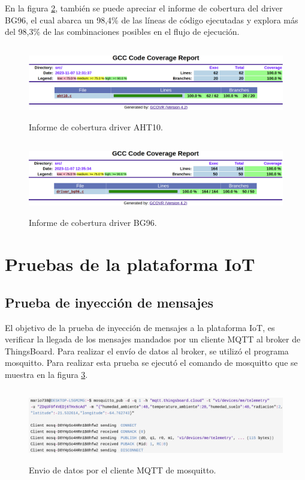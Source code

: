 En la figura \ref{fig:Cobertura BG96}, también se puede apreciar el informe de cobertura del driver BG96, el cual abarca un 98,4\% de las líneas de código ejecutadas y explora más del 98,3\% de las combinaciones posibles en el flujo de ejecución.

\begin{figure}[h!]
    \centering
      \includegraphics[width=\linewidth, height=3.2cm]{./Figures/cobertura_aht10_2.png}
    \caption{Informe de cobertura driver AHT10.}
      \label{fig:Cobertura aht10}
  \end{figure}

\begin{figure}[h!]
    \centering
      \includegraphics[width=\linewidth, height=3.2cm]{./Figures/cobertura_bg96_2.png}
    \caption{Informe de cobertura driver BG96.}
      \label{fig:Cobertura BG96}
\end{figure}

\section{Pruebas de la plataforma IoT}
\subsection{Prueba de inyección de mensajes}
El objetivo de la prueba de inyección de mensajes a la plataforma IoT, es verificar la llegada de los mensajes mandados por un cliente MQTT al broker de ThingsBoard.
Para realizar el envío de datos al broker, se utilizó el programa mosquitto. Para realizar esta prueba se ejecutó el comando de mosquitto que se muestra en la figura \ref{fig:mosquitto pub}.

\begin{figure}[h!]
  \centering
    \includegraphics[width=\linewidth, height=3.2cm]{./Figures/mosquito_enviodatos3.png}
  \caption{Envio de datos por el cliente MQTT de mosquitto.}
    \label{fig:mosquitto pub}
\end{figure}

